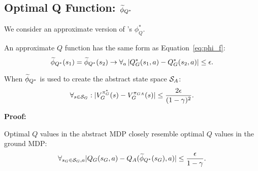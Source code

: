 


\subsection{Optimal Q Function: $\widetilde \phi_{Q^*}$}
\label{sec:Q*}

We consider an approximate version of \citeauthor{li2006towards}'s $\phi_Q^*$. 

\bdefn{$\epQ$}
An approximate $Q$ function has the same form as Equation~\ref{eq:phi_f}:
\begin{equation}
\widetilde \phi_{Q^*}(s_1) = \widetilde \phi_{Q^*}(s_2) \rightarrow \forall_a \left|Q_G^*(s_1, a) - Q_G^*(s_2, a)\right| \leq \epsilon.
\end{equation}
\edefn

\begin{lma}
\label{lma:Q*}
When $\widetilde \phi_{Q^*}$ is used to create the abstract state space $\mathcal{S}_A$:
\begin{equation}
\forall_{s \in \mathcal{S}_G}: | V_G^{\pi_G^*}(s) - V_G^{\pi_{GA}}(s) | \leq \frac{2\epsilon}{(1-\gamma)^2}.
\end{equation}
\end{lma}

\textbf{Proof:}
\begin{clm}
\label{clm:closeQs}
Optimal $Q$ values in the abstract \ac{MDP} closely resemble optimal $Q$ values in the ground \ac{MDP}:
\begin{equation}
\label{eq:Q*Claim1}
\forall_{s_G \in \mathcal{S}_G, a} |Q_G(s_G, a) - Q_A(\widetilde \phi_{Q^*}(s_G), a)| \leq \frac{\epsilon}{1-\gamma}.
\end{equation}
\end{clm}

